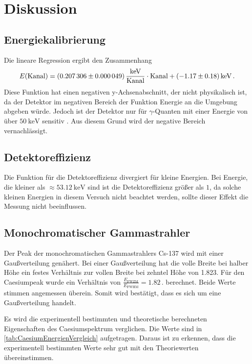 \section{Diskussion}
\label{sec:Diskussion}


\subsection{Energiekalibrierung}

Die lineare Regression ergibt den Zusammenhang 
\begin{equation*}
    E(\text{Kanal}) = \SI{0.207306 \pm 0.000049}{\frac{\kilo\eV}{\text{Kanal}}} \cdot \text{Kanal} + \SI{-1.17 \pm 0.18}{\kilo\eV}\,.
\end{equation*}
Diese Funktion hat einen negativen y-Achsenabschnitt, der nicht physikalisch ist, da der Detektor im negativen Bereich der Funktion Energie an die Umgebung abgeben würde.
Jedoch ist der Detektor nur für $\gamma$-Quanten mit einer Energie von über $\SI{50}{\kilo\eV}$ sensitiv \cite{v18}.
Aus diesem Grund wird der negative Bereich vernachlässigt.


\subsection{Detektoreffizienz}

Die Funktion für die Detektoreffizienz divergiert für kleine Energien.
Bei Energie, die kleiner als $\approx \SI{53.12}{\kilo\eV}$ sind ist die Detektoreffizienz größer als $1$, 
da solche kleinen Energien in diesem Versuch nicht beachtet werden, sollte dieser Effekt die Messung nicht beeinflussen.


\subsection{Monochromatischer Gammastrahler}

Der Peak der monochromatischen Gammastrahlers Cs-137 wird mit einer Gaußverteilung genähert.
Bei einer Gaußverteilung hat die volle Breite bei halber Höhe ein festes Verhältnis zur vollen Breite bei zehntel Höhe von 1.823.
Für den Caesiumpeak wurde ein Verhältnis von $\frac{E_{\text{FWZM}}}{E_{\text{FWHM}}} = 1.82\,.$ berechnet.
Beide Werte stimmen angemessen überein. Somit wird bestätigt, dass es sich um eine Gaußverteilung handelt.


Es wird die experimentell bestimmten und theoretische berechneten Eigenschaften des Caesiumspektrum verglichen.
Die Werte sind in \autoref{tab:CaesiumEnergienVergleich} aufgetragen. Daraus ist zu erkennen, dass die experimentell bestimmten Werte sehr gut mit den Theoriewerten übereinstimmen.

